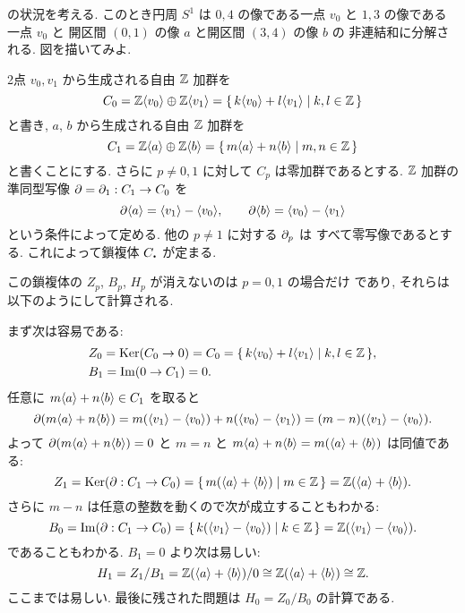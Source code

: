 \documentclass[12pt,twoside]{jarticle}
\begin{document}
\begin{example}
\label{example:S^1-nontrivial}
  の状況を考える.
  このとき円周 $S^1$ は $0,4$ の像である一点 $v_0$ 
  と $1,3$ の像である一点 $v_0$ と
  開区間 $(0,1)$ の像 $a$ と開区間 $(3,4)$ の像 $b$ の
  非連結和に分解される. 
  図を描いてみよ.

  2点 $v_0,v_1$ から生成される自由 ${\mathbb Z}$ 加群を
  \begin{equation*}
    C_0 = {\mathbb Z}\langle v_0\rangle\oplus{\mathbb Z}\langle v_1\rangle
    = \{\, k\langle v_0\rangle+l\langle v_1\rangle \mid k,l\in{\mathbb Z}\,\}
  \end{equation*}
  と書き, $a$, $b$ から生成される自由 ${\mathbb Z}$ 加群を
  \begin{equation*}
    C_1 = {\mathbb Z}\langle a\rangle\oplus{\mathbb Z}\langle b\rangle
    = \{\, m\langle a\rangle+n\langle b\rangle \mid m,n\in{\mathbb Z}\,\}
  \end{equation*}
  と書くことにする. さらに $p\ne 0,1$ に対して $C_p$ は零加群であるとする.
  ${\mathbb Z}$ 加群の準同型写像 $\partial=\partial_1: C_1 \to C_0$ を
  \begin{equation*}
    \partial\langle a\rangle = \langle v_1\rangle - \langle v_0\rangle, 
    \qquad 
    \partial\langle b\rangle = \langle v_0\rangle - \langle v_1\rangle
  \end{equation*}
  という条件によって定める. 他の $p\ne 1$ に対する $\partial_p$ は
  すべて零写像であるとする.
  これによって鎖複体 $C_\bcdot$ が定まる.
  
  この鎖複体の $Z_p$, $B_p$, $H_p$ が消えないのは $p=0,1$ の場合だけ
  であり, それらは以下のようにして計算される.

  まず次は容易である:
  \begin{align*}
    &
    Z_0 = \mathop{\mathrm{Ker}}\nolimits(C_0\to 0) = C_0 
    = \{\, k\langle v_0\rangle+l\langle v_1\rangle \mid k,l\in{\mathbb Z}\,\},
    \\ &
    B_1 = \mathop{\mathrm{Im}}\nolimits(0\to C_1) = 0.
  \end{align*}
  任意に $m\langle a\rangle+n\langle b\rangle\in C_1$ を取ると
  \begin{equation*}
    \partial(m\langle a\rangle+n\langle b\rangle) 
    = m(\langle v_1\rangle-\langle v_0\rangle)+n(\langle v_0\rangle-\langle v_1\rangle) 
    = (m-n)(\langle v_1\rangle-\langle v_0\rangle).
  \end{equation*}
  よって $\partial(m\langle a\rangle+n\langle b\rangle)=0$ 
  と $m=n$ と $m\langle a\rangle+n\langle b\rangle=m(\langle a\rangle+\langle b\rangle)$ は同値である:
  \begin{equation*}
    Z_1 = \mathop{\mathrm{Ker}}\nolimits(\partial:C_1\to C_0) 
    = \{\, m(\langle a\rangle+\langle b\rangle) \mid m\in{\mathbb Z}\,\} 
    = {\mathbb Z}(\langle a\rangle+\langle b\rangle).
  \end{equation*}
  さらに $m-n$ は任意の整数を動くので次が成立することもわかる:
  \begin{equation*}
    B_0 = \mathop{\mathrm{Im}}\nolimits(\partial:C_1\to C_0) 
    = \{\, k(\langle v_1\rangle-\langle v_0\rangle) \mid k\in{\mathbb Z}\,\} 
    = {\mathbb Z}(\langle v_1\rangle-\langle v_0\rangle).
  \end{equation*}
  であることもわかる. $B_1=0$ より次は易しい:
  \begin{equation*}
    H_1 = Z_1/B_1 
    = {\mathbb Z}(\langle a\rangle+\langle b\rangle)/0 \cong {\mathbb Z}(\langle a\rangle+\langle b\rangle) \cong {\mathbb Z}.
  \end{equation*}
  ここまでは易しい. 最後に残された問題は $H_0=Z_0/B_0$ の計算である.
  

\end{example}
\end{document}
